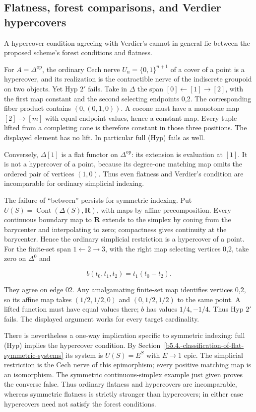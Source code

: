 \documentclass[11pt,a4paper]{article}
\theoremstyle{definition}
\begin{document}
\subsection{Flatness, forest comparisons, and Verdier
hypercovers}\label{b5.5.-flatness-forest-comparisons-and-verdier-hypercovers}

A hypercover condition agreeing with Verdier's cannot in
general lie between the proposed scheme's forest conditions and flatness.

For \(A=\Delta^{\mathrm{op}}\), the ordinary Cech nerve
\(U_n=\{0,1\}^{n+1}\) of a cover of a point is a hypercover, and its
realization is the contractible nerve of the indiscrete groupoid on two
objects. Yet Hyp \(2'\) fails. Take in \(\Delta\) the span
\([0]\leftarrow[1]\to[2]\), with the first map constant and the second
selecting endpoints 0,2. The corresponding fiber product contains
\((0,(0,1,0))\). A cocone must have a monotone map \([2]\to[m]\) with
equal endpoint values, hence a constant map. Every tuple lifted from a
completing cone is therefore constant in those three positions. The
displayed element has no lift. In particular full (Hyp) fails as well.

Conversely, \(\Delta[1]\) is a flat functor on \(\Delta^{\mathrm{op}}\):
its extension is evaluation at \([1]\). It is not a hypercover of a
point, because its degree-one matching map omits the ordered pair of
vertices \((1,0)\). Thus even flatness and Verdier's condition are
incomparable for ordinary simplicial indexing.

The failure of ``between'' persists for symmetric indexing. Put
\(U(S)=\operatorname{Cont}(\Delta(S),\mathbf R)\), with maps by affine
precomposition. Every continuous boundary map to \(\mathbf R\) extends
to the simplex by coning from the barycenter and interpolating to zero;
compactness gives continuity at the barycenter. Hence the ordinary
simplicial restriction is a hypercover of a point. For the finite-set
span \(1\leftarrow2\to3\), with the right map selecting vertices 0,2,
take zero on \(\Delta^0\) and

\[b(t_0,t_1,t_2)=t_1(t_0-t_2).\]

They agree on edge 02. Any amalgamating finite-set map identifies
vertices 0,2, so its affine map takes \((1/2,1/2,0)\) and
\((0,1/2,1/2)\) to the same point. A lifted function must have equal
values there; \(b\) has values \(1/4,-1/4\). Thus Hyp \(2'\) fails.
The displayed argument works for every target cardinality.

There is nevertheless a one-way implication specific to symmetric
indexing: full (Hyp) implies the hypercover condition. By Section~\ref{b5.4.-classification-of-flat-symmetric-systems} its system
is \(U(S)=E^S\) with \(E\to1\) epic. The simplicial restriction is the
Cech nerve of this epimorphism; every positive matching map is an
isomorphism. The symmetric continuous-simplex example just given proves
the converse false. Thus ordinary flatness and hypercovers are
incomparable, whereas symmetric flatness is strictly stronger than
hypercovers; in either case hypercovers need not satisfy the forest
conditions.
\end{document}
